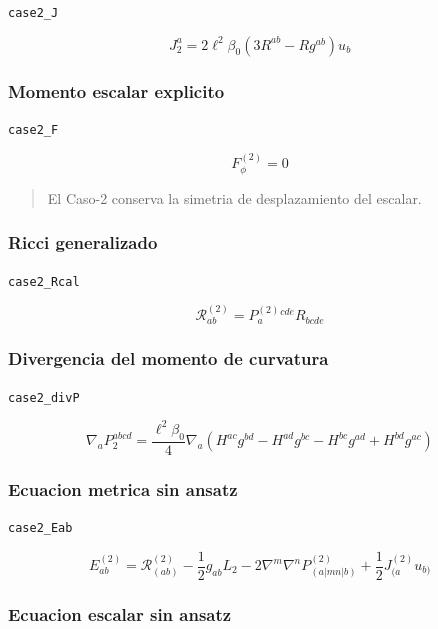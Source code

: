 \documentclass[11pt,a4paper]{article}
\begin{document}
\noindent\texttt{case2\_J}\par\nopagebreak[4]

\[
J_2^a = 2\ell^2\beta_0\left(3R^{ab}-Rg^{ab}\right)u_b
\]

\subsubsection{Momento escalar explicito}

\noindent\texttt{case2\_F}\par\nopagebreak[4]

\[
F_\phi^{(2)} = 0
\]

\begin{quote}\small El Caso-2 conserva la simetria de desplazamiento del escalar.\end{quote}

\subsubsection{Ricci generalizado}

\noindent\texttt{case2\_Rcal}\par\nopagebreak[4]

\[
\mathcal R^{(2)}_{ab} = P^{(2)}_a{}^{cde}R_{bcde}
\]

\subsubsection{Divergencia del momento de curvatura}

\noindent\texttt{case2\_divP}\par\nopagebreak[4]

\[
\nabla_aP_2^{abcd} = \frac{\ell^2\beta_0}{4}\nabla_a\left(H^{ac}g^{bd}-H^{ad}g^{bc}-H^{bc}g^{ad}+H^{bd}g^{ac}\right)
\]

\subsubsection{Ecuacion metrica sin ansatz}

\noindent\texttt{case2\_Eab}\par\nopagebreak[4]

\[
E^{(2)}_{ab} = \mathcal R^{(2)}_{(ab)}-\frac12g_{ab}L_2-2\nabla^m\nabla^nP^{(2)}_{(a|mn|b)}+\frac12J^{(2)}_{(a}u_{b)}
\]

\subsubsection{Ecuacion escalar sin ansatz}
\end{document}
